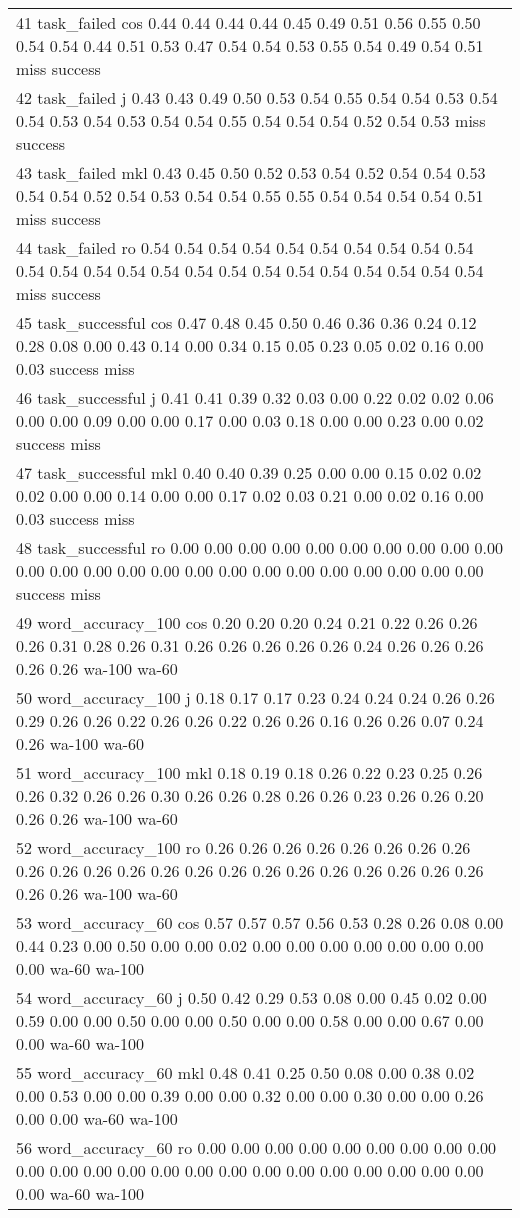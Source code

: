\begin{table}[!tbp]
\begin{center}
\begin{tabular}{l}
41              task\_failed cos 0.44 0.44 0.44 0.44 0.45 0.49 0.51 0.56 0.55 0.50 0.54 0.54 0.44 0.51 0.53 0.47 0.54 0.54 0.53 0.55 0.54 0.49 0.54 0.51      miss   success\tabularnewline
42              task\_failed   j 0.43 0.43 0.49 0.50 0.53 0.54 0.55 0.54 0.54 0.53 0.54 0.54 0.53 0.54 0.53 0.54 0.54 0.55 0.54 0.54 0.54 0.52 0.54 0.53      miss   success\tabularnewline
43              task\_failed mkl 0.43 0.45 0.50 0.52 0.53 0.54 0.52 0.54 0.54 0.53 0.54 0.54 0.52 0.54 0.53 0.54 0.54 0.55 0.55 0.54 0.54 0.54 0.54 0.51      miss   success\tabularnewline
44              task\_failed  ro 0.54 0.54 0.54 0.54 0.54 0.54 0.54 0.54 0.54 0.54 0.54 0.54 0.54 0.54 0.54 0.54 0.54 0.54 0.54 0.54 0.54 0.54 0.54 0.54      miss   success\tabularnewline
45          task\_successful cos 0.47 0.48 0.45 0.50 0.46 0.36 0.36 0.24 0.12 0.28 0.08 0.00 0.43 0.14 0.00 0.34 0.15 0.05 0.23 0.05 0.02 0.16 0.00 0.03   success      miss\tabularnewline
46          task\_successful   j 0.41 0.41 0.39 0.32 0.03 0.00 0.22 0.02 0.02 0.06 0.00 0.00 0.09 0.00 0.00 0.17 0.00 0.03 0.18 0.00 0.00 0.23 0.00 0.02   success      miss\tabularnewline
47          task\_successful mkl 0.40 0.40 0.39 0.25 0.00 0.00 0.15 0.02 0.02 0.02 0.00 0.00 0.14 0.00 0.00 0.17 0.02 0.03 0.21 0.00 0.02 0.16 0.00 0.03   success      miss\tabularnewline
48          task\_successful  ro 0.00 0.00 0.00 0.00 0.00 0.00 0.00 0.00 0.00 0.00 0.00 0.00 0.00 0.00 0.00 0.00 0.00 0.00 0.00 0.00 0.00 0.00 0.00 0.00   success      miss\tabularnewline
49        word\_accuracy\_100 cos 0.20 0.20 0.20 0.24 0.21 0.22 0.26 0.26 0.26 0.31 0.28 0.26 0.31 0.26 0.26 0.26 0.26 0.26 0.24 0.26 0.26 0.26 0.26 0.26    wa-100     wa-60\tabularnewline
50        word\_accuracy\_100   j 0.18 0.17 0.17 0.23 0.24 0.24 0.24 0.26 0.26 0.29 0.26 0.26 0.22 0.26 0.26 0.22 0.26 0.26 0.16 0.26 0.26 0.07 0.24 0.26    wa-100     wa-60\tabularnewline
51        word\_accuracy\_100 mkl 0.18 0.19 0.18 0.26 0.22 0.23 0.25 0.26 0.26 0.32 0.26 0.26 0.30 0.26 0.26 0.28 0.26 0.26 0.23 0.26 0.26 0.20 0.26 0.26    wa-100     wa-60\tabularnewline
52        word\_accuracy\_100  ro 0.26 0.26 0.26 0.26 0.26 0.26 0.26 0.26 0.26 0.26 0.26 0.26 0.26 0.26 0.26 0.26 0.26 0.26 0.26 0.26 0.26 0.26 0.26 0.26    wa-100     wa-60\tabularnewline
53         word\_accuracy\_60 cos 0.57 0.57 0.57 0.56 0.53 0.28 0.26 0.08 0.00 0.44 0.23 0.00 0.50 0.00 0.00 0.02 0.00 0.00 0.00 0.00 0.00 0.00 0.00 0.00     wa-60    wa-100\tabularnewline
54         word\_accuracy\_60   j 0.50 0.42 0.29 0.53 0.08 0.00 0.45 0.02 0.00 0.59 0.00 0.00 0.50 0.00 0.00 0.50 0.00 0.00 0.58 0.00 0.00 0.67 0.00 0.00     wa-60    wa-100\tabularnewline
55         word\_accuracy\_60 mkl 0.48 0.41 0.25 0.50 0.08 0.00 0.38 0.02 0.00 0.53 0.00 0.00 0.39 0.00 0.00 0.32 0.00 0.00 0.30 0.00 0.00 0.26 0.00 0.00     wa-60    wa-100\tabularnewline
56         word\_accuracy\_60  ro 0.00 0.00 0.00 0.00 0.00 0.00 0.00 0.00 0.00 0.00 0.00 0.00 0.00 0.00 0.00 0.00 0.00 0.00 0.00 0.00 0.00 0.00 0.00 0.00     wa-60    wa-100\tabularnewline
\hline
\end{tabular}\end{center}

\end{table}
